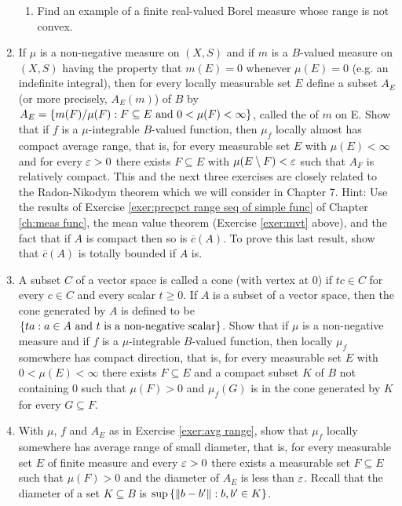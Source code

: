 \begin{enumerate}[label=\arabic*),ref=\arabic*]
\begin{enumerate}[label=\alph*),ref=\theenumi\alph*)]
    \item Find an example of a finite real-valued Borel measure whose range is not convex.
\end{enumerate}

\item \label{exer:avg range}
If $\mu$ is a non-negative measure on $(X, S)$ and if $m$ is a $B$-valued measure on $(X,S)$ having the property that $m(E)=0$ whenever $\mu(E)=0$ (e.g. an indefinite integral), then for every locally measurable set $E$ define a subset $A_E$ (or more precisely, $A_E(m)$) of $B$ by $A_E=\left\{m(F)/\mu(F):F\subseteq E\text{ and }0<\mu(F)<\infty\right\}$, called the  of $m$ on E. Show that if $f$ is a $\mu$-integrable $B$-valued function, then $\mu_f$ locally almost has compact average range, that is, for every measurable set $E$ with $\mu(E)<\infty$ and for every $\varepsilon>0$ there exists $F\subseteq E$ with $\mu(E\setminus F)<\varepsilon$ such that $A_F$ is relatively compact. This and the next three exercises are closely related to the Radon-Nikodym theorem which we will consider in Chapter 7. %
Hint: Use the results of Exercise \ref{exer:precpct range seq of simple func} of Chapter \ref{ch:meas func}, the mean value theorem (Exercise \ref{exer:mvt} above), and the fact that if $A$ is compact then so is $\overline{c}(A)$. To prove this last result, show that $\overline{c}(A)$ is totally bounded if $A$ is.

\item \label{exer:cone}
A subset $C$ of a vector space is called a cone (with vertex at 0) if $tc\in C$ for every $c\in C$ and every scalar $t\geq0$. If $A$ is a subset of a vector space, then the cone generated by $A$ is defined to be $\left\{ta:a\in A\text{ and }t\text{ is a non-negative scalar}\right\}$. Show that if $\mu$ is a non-negative measure and if $f$ is a $\mu$-integrable $B$-valued function, then locally $\mu_f$ somewhere has compact direction, that is, for every measurable set $E$ with $0<\mu(E)<\infty$ there exists $F\subseteq E$ and a compact subset $K$ of $B$ not containing $0$ such that $\mu(F)>0$ and $\mu_f(G)$ is in the cone generated by $K$ for every $G\subseteq F$.

\item \label{exer:indef int locally avg range of small diam}
With $\mu$, $f$ and $A_E$ as in Exercise \ref{exer:avg range}, show that $\mu_f$ locally somewhere has average range of small diameter, that is, for every measurable set $E$ of finite measure and every $\varepsilon>0$ there exists a measurable set $F\subseteq E$ such that $\mu(F)>0$ and the diameter of $A_E$ is less than $\varepsilon$. Recall that the diameter of a set $K\subseteq B$ is $\sup\left\{\norm{b-b'}:b,b'\in K\right\}$.


\end{enumerate}
